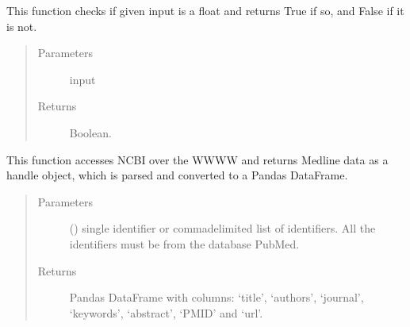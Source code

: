 \documentclass[letterpaper,10pt,english]{sphinxmanual}
\begin{document}

\begin{fulllineitems}
\label{\detokenize{_autosummary/graphdb_builder:graphdb_builder.builder_utils.is_number}}
This function checks if given input is a float and returns True if so, and False if it is not.
\begin{quote}\begin{description}
\item[{Parameters}] \leavevmode
{} \textendash{} input

\item[{Returns}] \leavevmode
Boolean.

\end{description}\end{quote}

\end{fulllineitems}


\begin{fulllineitems}
\label{\detokenize{_autosummary/graphdb_builder:graphdb_builder.builder_utils.getMedlineAbstracts}}
This function accesses NCBI over the WWWW and returns Medline data as a handle object,     which is parsed and converted to a Pandas DataFrame.
\begin{quote}\begin{description}
\item[{Parameters}] \leavevmode
{} () \textendash{} single identifier or comma\sphinxhyphen{}delimited list of identifiers. All the identifiers                     must be from the database PubMed.

\item[{Returns}] \leavevmode
Pandas DataFrame with columns: ‘title’, ‘authors’, ‘journal’, ‘keywords’, ‘abstract’, ‘PMID’ and ‘url’.

\end{description}\end{quote}

\end{fulllineitems}
\end{document}
